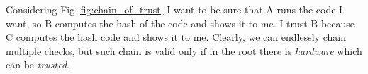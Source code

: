 Considering Fig \ref{fig:chain_of_trust} I want to be sure that A runs the code I want, so
B computes the hash of the code and shows it to me.
I trust B because C computes the hash code and shows it to me.
Clearly, we can endlessly chain multiple checks,
but such chain is valid only if in the root there is \textit{hardware} which can be \textit{trusted}.